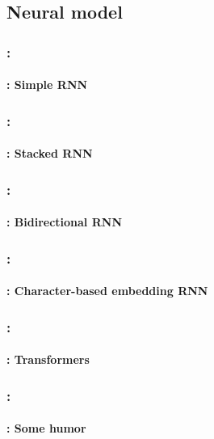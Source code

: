 \documentclass[xcolor=table]{beamer}
\begin{document}
\subsection{Neural model}

\begin{frame}
	\frametitle{\insertshortsubtitle: \insertsection}
	\framesubtitle{\insertsubsection: Simple RNN}


\end{frame}

\begin{frame}
	\frametitle{\insertshortsubtitle: \insertsection}
	\framesubtitle{\insertsubsection: Stacked RNN}


\end{frame}

\begin{frame}
	\frametitle{\insertshortsubtitle: \insertsection}
	\framesubtitle{\insertsubsection: Bidirectional RNN}


\end{frame}

\begin{frame}
	\frametitle{\insertshortsubtitle: \insertsection}
	\framesubtitle{\insertsubsection: Character-based embedding RNN}


\end{frame}

\begin{frame}
	\frametitle{\insertshortsubtitle: \insertsection}
	\framesubtitle{\insertsubsection: Transformers}
	
	
\end{frame}

\begin{frame}
	\frametitle{\insertshortsubtitle: \insertsection}
	\framesubtitle{\insertsubsection: Some humor}

	\begin{center}
	\end{center}

\end{frame}

\end{document}
